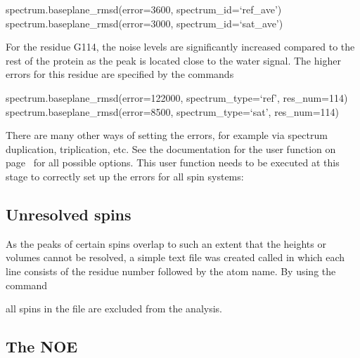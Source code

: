 \begin{exampleenv}
spectrum.baseplane\_rmsd(error=3600, spectrum\_id=`ref\_ave') \\
spectrum.baseplane\_rmsd(error=3000, spectrum\_id=`sat\_ave')
\end{exampleenv}

For the residue G114, the noise levels are significantly increased compared to the rest of the protein as the peak is located close to the water signal.  The higher errors for this residue are specified by the commands

\begin{exampleenv}
spectrum.baseplane\_rmsd(error=122000, spectrum\_type=`ref', res\_num=114) \\
spectrum.baseplane\_rmsd(error=8500, spectrum\_type=`sat', res\_num=114)
\end{exampleenv}

There are many other ways of setting the errors, for example via spectrum duplication, triplication, etc.  See the documentation for the  user function on page~\pageref{uf: spectrum.error_analysis} for all possible options.  This user function needs to be executed at this stage to correctly set up the errors for all spin systems:




\subsection{Unresolved spins}

As the peaks of certain spins overlap to such an extent that the heights or volumes cannot be resolved, a simple text file was created called  in which each line consists of the residue number followed by the atom name.  By using the command


all spins in the file  are excluded from the analysis.




\subsection{The NOE}

